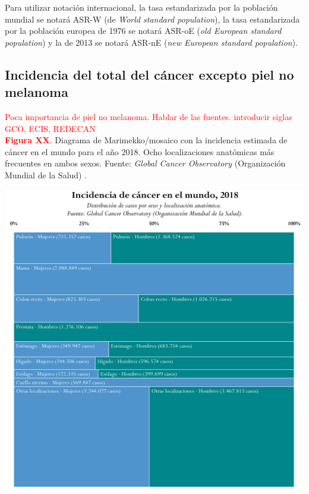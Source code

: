 Para utilizar notación internacional, la tasa estandarizada por la población mundial se notará ASR-W (de \textit{World standard population}), la tasa estandarizada por la población europea de 1976 se notará ASR-oE (\textit{old European standard population}) y la de 2013 se notará ASR-nE (\textit{new European standard population}).\\

\subsection{Incidencia del total del cáncer excepto piel no melanoma}

\textcolor{red}{Poca importancia de piel no melanoma. Hablar de las fuentes. introducir siglas GCO, ECIS, REDECAN}\\

\newpage
\textbf{\textcolor{red}{Figura XX}}. Diagrama de Marimekko/mosaico con la incidencia estimada de cáncer en el mundo para el año 2018. Ocho localizaciones anatómicas más frecuentes en ambos sexos. Fuente: \textit{Global Cancer Observatory} (Organización Mundial de la Salud) \cite{GCO}.
\begin{center}
	\includegraphics[width=1\textwidth]{figuras/marimekko_gco.png} \\
\end{center}



